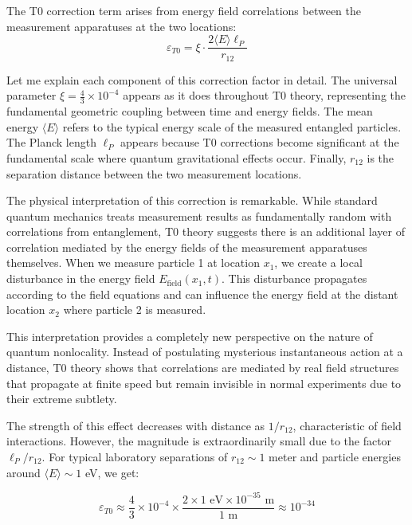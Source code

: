\documentclass[12pt,a4paper]{article}
\newcommand{\xipar}{\xi}
\theoremstyle{definition}
\theoremstyle{remark}
\begin{document}
The T0 correction term arises from energy field correlations between the measurement apparatuses at the two locations:
\begin{equation}
	\varepsilon_{T0} = \xipar \cdot \frac{2\langle E \rangle \ell_P}{r_{12}}
	\label{eq:t0_bell_correction}
\end{equation}

Let me explain each component of this correction factor in detail. The universal parameter $\xipar = \frac{4}{3} \times 10^{-4}$ appears as it does throughout T0 theory, representing the fundamental geometric coupling between time and energy fields. The mean energy $\langle E \rangle$ refers to the typical energy scale of the measured entangled particles. The Planck length $\ell_P$ appears because T0 corrections become significant at the fundamental scale where quantum gravitational effects occur. Finally, $r_{12}$ is the separation distance between the two measurement locations.

The physical interpretation of this correction is remarkable. While standard quantum mechanics treats measurement results as fundamentally random with correlations from entanglement, T0 theory suggests there is an additional layer of correlation mediated by the energy fields of the measurement apparatuses themselves. When we measure particle 1 at location $x_1$, we create a local disturbance in the energy field $E_{\text{field}}(x_1, t)$. This disturbance propagates according to the field equations and can influence the energy field at the distant location $x_2$ where particle 2 is measured.

This interpretation provides a completely new perspective on the nature of quantum nonlocality. Instead of postulating mysterious instantaneous action at a distance, T0 theory shows that correlations are mediated by real field structures that propagate at finite speed but remain invisible in normal experiments due to their extreme subtlety.

The strength of this effect decreases with distance as $1/r_{12}$, characteristic of field interactions. However, the magnitude is extraordinarily small due to the factor $\ell_P/r_{12}$. For typical laboratory separations of $r_{12} \sim 1$ meter and particle energies around $\langle E \rangle \sim 1$ eV, we get:

\begin{equation}
	\varepsilon_{T0} \approx \frac{4}{3} \times 10^{-4} \times \frac{2 \times 1 \text{ eV} \times 10^{-35} \text{ m}}{1 \text{ m}} \approx 10^{-34}
\end{equation}
\end{document}
